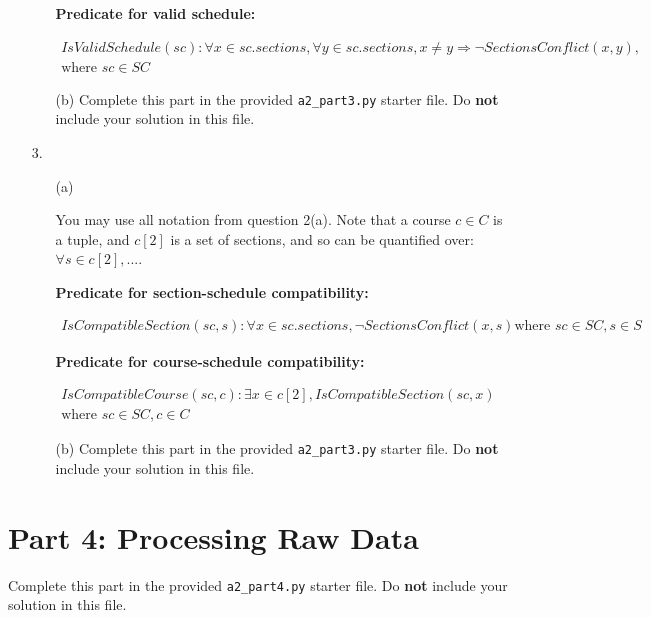 \documentclass[fontsize=11pt]{article}
\begin{document}
\begin{enumerate}
\begin{enumerate}
                \textbf{Predicate for valid schedule:}


                \begin{align*}
                    IsValidSchedule(sc) : \forall x \in sc.sections, \forall y \in sc.sections, x \neq y \Rightarrow \neg SectionsConflict(x, y), & \\
                    \text{where $sc \in SC$}                                                                                            &
                \end{align*}


            \item[(b)]
                Complete this part in the provided \texttt{a2\_part3.py} starter file.
                Do \textbf{not} include your solution in this file.
        \end{enumerate}

    \item[3.]

        \begin{enumerate}
            \item[(a)]

                You may use all notation from question 2(a).
                Note that a course $c \in C$ is a tuple, and $c[2]$ is a set of sections, and so can be quantified over: $\forall s \in c[2], ...$.

                \smallskip

                \textbf{Predicate for section-schedule compatibility:}


                \begin{align*}
                    IsCompatibleSection(sc, s) : \forall x \in sc.sections, \neg SectionsConflict(x, s)
                    \text{where $sc \in SC, s \in S$}
                \end{align*}

                \smallskip

                \textbf{Predicate for course-schedule compatibility:}


                \begin{align*}
                    IsCompatibleCourse(sc, c) : \exists x \in c[2], IsCompatibleSection(sc, x) & \\
                    \text{where $sc \in SC, c \in C$}
                \end{align*}

            \item[(b)]
                Complete this part in the provided \texttt{a2\_part3.py} starter file.
                Do \textbf{not} include your solution in this file.
        \end{enumerate}

\end{enumerate}

\section*{Part 4: Processing Raw Data}
Complete this part in the provided \texttt{a2\_part4.py} starter file.
Do \textbf{not} include your solution in this file.
\end{document}
